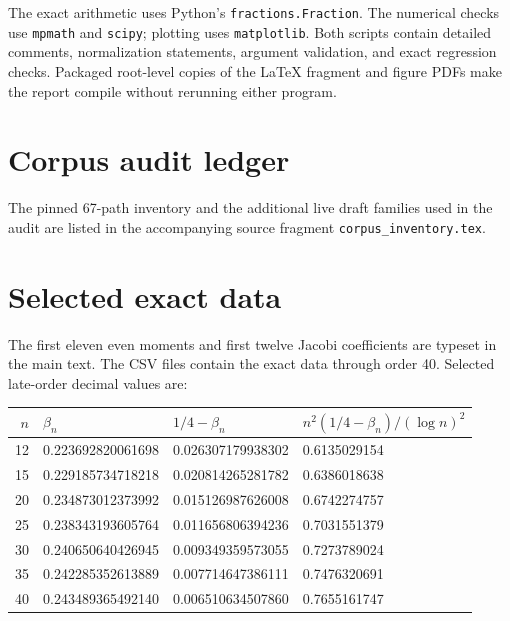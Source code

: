 \documentclass[11pt,oneside]{article}
\theoremstyle{definition}
\begin{document}
The exact arithmetic uses Python's \texttt{fractions.Fraction}.  The numerical checks use
\texttt{mpmath} and \texttt{scipy}; plotting uses \texttt{matplotlib}.  Both scripts contain
detailed comments, normalization statements, argument validation, and exact regression
checks.  Packaged root-level copies of the LaTeX fragment and figure PDFs make the report
compile without rerunning either program.

\section{Corpus audit ledger}\label{p3:app:corpus}

The pinned 67-path inventory and the additional live draft families used in the audit are
listed in the accompanying source fragment \texttt{corpus\_inventory.tex}.



\section{Selected exact data}\label{p3:app:data}

The first eleven even moments and first twelve Jacobi coefficients are typeset in the main
text.  The CSV files contain the exact data through order 40.  Selected late-order decimal
values are:
\begin{center}
\begin{tabular}{rlll}
\toprule
\(n\) & \(\beta_n\) & \(1/4-\beta_n\) &
\(n^2(1/4-\beta_n)/(\log n)^2\) \\
\midrule
12 & 0.223692820061698 & 0.026307179938302 & 0.6135029154 \\
15 & 0.229185734718218 & 0.020814265281782 & 0.6386018638 \\
20 & 0.234873012373992 & 0.015126987626008 & 0.6742274757 \\
25 & 0.238343193605764 & 0.011656806394236 & 0.7031551379 \\
30 & 0.240650640426945 & 0.009349359573055 & 0.7273789024 \\
35 & 0.242285352613889 & 0.007714647386111 & 0.7476320691 \\
40 & 0.243489365492140 & 0.006510634507860 & 0.7655161747 \\
\bottomrule
\end{tabular}
\end{center}
\end{document}
